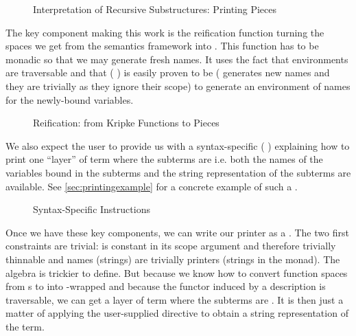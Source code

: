 \begin{figure}[h]
\caption{Interpretation of Recursive Substructures: Printing Pieces\label{fig:printingpieces}}
\end{figure}

The key component making this work is the reification function
 turning the  spaces we get from the semantics
framework into . This function has to be monadic so that we may generate
fresh names. It uses the fact that environments are traversable and that
({ }) is easily proven to be  ( generates new
names and they are trivially  as they ignore their scope) to
generate an environment of names for the newly-bound variables.

\begin{figure}[h]
\caption{Reification: from Kripke Functions to Pieces\label{fig:printingreify}}
\end{figure}

We also expect the user to provide us with a syntax-specific ({ })
explaining how to print one ``layer'' of term where the subterms are  i.e.
both the names of the variables bound in the subterms and the string representation of
the subterms are available. See \cref{sec:printingexample} for a concrete example of
such a .

\begin{figure}[h]
\caption{Syntax-Specific  Instructions\label{fig:printingdisplay}}
\end{figure}

Once we have these key components, we can write our printer as a . The two
first constraints are trivial:  is constant in its scope argument and therefore
trivially thinnable and names (strings) are trivially printers (strings in the 
monad). The algebra is trickier to define. But because we know how to convert 
function spaces from s to  into -wrapped  and
because the functor induced by a description is traversable, we can get a layer of
term where the subterms are . It is then just a matter of applying the
user-supplied  directive to obtain a string representation of the term.

